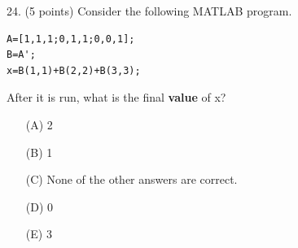 \documentclass{article}
\begin{document}
\noindent
\begin{minipage}{\textwidth}
24. (5 points)
Consider the following MATLAB program.
\begin{verbatim}
A=[1,1,1;0,1,1;0,0,1];
B=A';
x=B(1,1)+B(2,2)+B(3,3);
\end{verbatim}
After it is run, what is the final \textbf{value} of x?

\begin{enumerate}
\item[(A)]
2

\item[(B)]
1

\item[(C)]
None of the other answers are correct.

\item[(D)]
0

\item[(E)]
3

\end{enumerate}
\end{minipage}
\vspace{10em}
\filbreak\vfil{}\vfilneg
\end{document}
